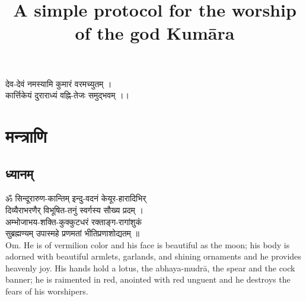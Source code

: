 \documentclass[13pt]{article}
\title{\textbf{A simple protocol for the worship of the god Kumāra}}
\author{}
\date{}
\begin{document}
\maketitle
\begin{center}
{\skt
देव-देवं नमस्यामि कुमारं वरमच्युतम् ।\\
कार्त्तिकेयं दुराराध्यं वह्नि-तेजः समुद्भवम् ।। 
}\\
 \end{center}
\section{{\skt मन्त्राणि}}
\subsection{{\skt ध्यानम् }}
{\skt ॐ सिन्दूरारुण-कान्तिम् इन्दु-वदनं केयूर-हारादिभिर् \\
दिव्यैराभरणैर् विभूषित-तनुं स्वर्गस्य सौख्य प्रदम् ।\\ 
अम्भोजाभय-शक्ति-कुक्कुटधरं रक्ताङ्ग-रागांशुकं \\
सुब्रह्मण्यम् उपास्महे प्रणमतां भीतिप्रणाशोद्यतम् ॥
}\\[8pt]
Om. He is of vermilion color and his face is beautiful as the moon; his body is adorned with beautiful armlets, garlands, and shining ornaments and he provides heavenly joy. His hands hold a lotus, the abhaya-mudrā, the spear and the cock banner; he is raimented in red, anointed with red unguent and he destroys the fears of his worshipers.
\end{document}
